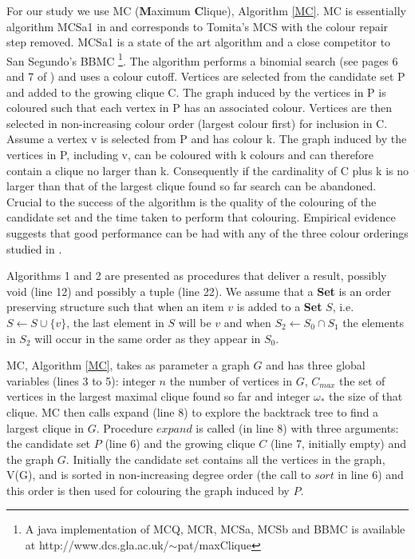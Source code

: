 \documentclass{l4proj}
\begin{document}
For our study we use MC ({\bf M}aximum {\bf C}lique), Algorithm \ref{MC}. MC is essentially algorithm MCSa1 in \cite{tr-2012-333}
and corresponds to Tomita's MCS \cite{tomita2010} with the colour 
repair step removed. MCSa1 is a state of the art
algorithm and a close competitor to San Segundo's BBMC \cite{segundo2011}\footnote{A java implementation
of MCQ, MCR, MCSa, MCSb and BBMC is available at http://www.dcs.gla.ac.uk/$\sim$pat/maxClique}.
The algorithm performs a binomial search
(see pages 6 and 7 of \cite{dek}) and uses a colour cutoff. Vertices are selected from the candidate set P 
and added to the growing clique C. The graph induced by the vertices in P is coloured such that each vertex in P has an associated colour.
Vertices are then selected in non-increasing colour order (largest colour first) for inclusion in C. 
Assume a vertex v is selected from P and has colour k.
The graph induced by the vertices in P, including v, can be coloured with k colours and 
can therefore contain a clique no larger than k. Consequently if the cardinality of C plus k is no larger than
that of the largest clique found so far search can be abandoned. Crucial to the success of the algorithm is the quality of
the colouring of the candidate set and the time taken to perform that colouring. Empirical evidence
suggests that good performance can be had with any of the three colour orderings studied in \cite{tr-2012-333}.

Algorithms 1 and 2 are presented as procedures that deliver a result, possibly void (line 12) and
possibly a tuple (line 22). We assume that a {\bf Set} is an order preserving structure such that when an item $v$
is added to a {\bf Set} $S$, i.e. $S \gets S \cup \{v\}$, the last element in $S$ will be $v$ and when
$S_{2} \gets S_{0} \cap S_{1}$ the elements in $S_{2}$ will occur in the same order as they appear in $S_{0}$.

MC, Algorithm \ref{MC}, takes as parameter a graph $G$ and has three global variables (lines 3 to 5): integer $n$ the 
number of vertices in $G$, $C_{max}$ the set of vertices in 
the largest maximal clique found so far and integer $\omega_{*}$ the size of that clique. MC then calls expand (line 8) to explore the 
backtrack tree to find a largest clique in $G$. Procedure $expand$ is called (in line 8) with three arguments: the candidate set $P$ (line 6) 
and the growing clique $C$ (line 7, initially empty) and the graph $G$. Initially the candidate set contains all the vertices in the graph, V(G), 
and is sorted in non-increasing degree order (the call to $sort$ in line 6) and this order is then used for colouring the graph induced by $P$.
\end{document}
